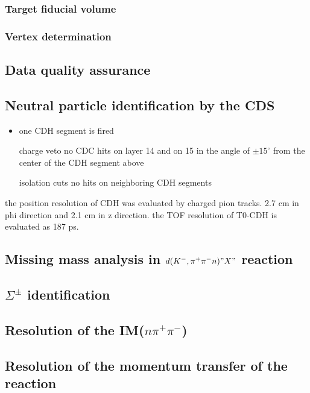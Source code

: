 \subsubsection{Target fiducial volume}

\subsubsection{Vertex determination}


\subsection{Data quality assurance}


\subsection{Neutral particle identification by the CDS}
\begin{itemize}
\item one CDH segment is fired
\item [charge veto] no CDC hits on layer 14 and on 15 in the angle of $\pm 15^\circ$ from the center of the CDH segment above
\item [isolation cuts] no hits on neighboring CDH segments
\end{itemize}

the position resolution of CDH was evaluated by charged pion tracks. 2.7 cm in phi direction and 2.1 cm in z direction.
the TOF resolution of T0-CDH is evaluated as 187 ps.


\subsection{Missing mass analysis in $d(K^-,\pi^+\pi^-n)"X"$ reaction}




\subsection{$\Sigma^{\pm}$ identification}

\subsection{Resolution of the IM($n\pi^{+}\pi^{-}$)}

\subsection{Resolution of the momentum transfer of the reaction}

